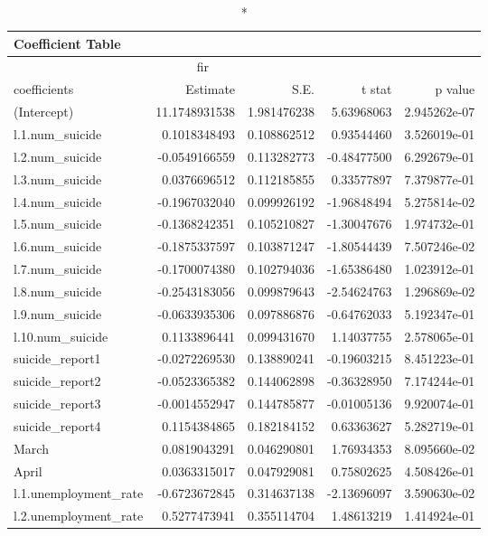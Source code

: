 \begin{longtable}{lrrrr}
\caption*{
{\large Coefficient Table}
} \\ 
\toprule
\multicolumn{4}{c}{fir} &  \\ 
\cmidrule(lr){1-4}
coefficients & Estimate & S.E. & t stat & p value \\ 
\midrule
(Intercept) & 11.1748931538 & 1.981476238 & 5.63968063 & 2.945262e-07 \\ 
l.1.num\_suicide & 0.1018348493 & 0.108862512 & 0.93544460 & 3.526019e-01 \\ 
l.2.num\_suicide & -0.0549166559 & 0.113282773 & -0.48477500 & 6.292679e-01 \\ 
l.3.num\_suicide & 0.0376696512 & 0.112185855 & 0.33577897 & 7.379877e-01 \\ 
l.4.num\_suicide & -0.1967032040 & 0.099926192 & -1.96848494 & 5.275814e-02 \\ 
l.5.num\_suicide & -0.1368242351 & 0.105210827 & -1.30047676 & 1.974732e-01 \\ 
l.6.num\_suicide & -0.1875337597 & 0.103871247 & -1.80544439 & 7.507246e-02 \\ 
l.7.num\_suicide & -0.1700074380 & 0.102794036 & -1.65386480 & 1.023912e-01 \\ 
l.8.num\_suicide & -0.2543183056 & 0.099879643 & -2.54624763 & 1.296869e-02 \\ 
l.9.num\_suicide & -0.0633935306 & 0.097886876 & -0.64762033 & 5.192347e-01 \\ 
l.10.num\_suicide & 0.1133896441 & 0.099431670 & 1.14037755 & 2.578065e-01 \\ 
suicide\_report1 & -0.0272269530 & 0.138890241 & -0.19603215 & 8.451223e-01 \\ 
suicide\_report2 & -0.0523365382 & 0.144062898 & -0.36328950 & 7.174244e-01 \\ 
suicide\_report3 & -0.0014552947 & 0.144785877 & -0.01005136 & 9.920074e-01 \\ 
suicide\_report4 & 0.1154384865 & 0.182184152 & 0.63363627 & 5.282719e-01 \\ 
March & 0.0819043291 & 0.046290801 & 1.76934353 & 8.095660e-02 \\ 
April & 0.0363315017 & 0.047929081 & 0.75802625 & 4.508426e-01 \\ 
l.1.unemployment\_rate & -0.6723672845 & 0.314637138 & -2.13696097 & 3.590630e-02 \\ 
l.2.unemployment\_rate & 0.5277473941 & 0.355114704 & 1.48613219 & 1.414924e-01 \\ 

\end{longtable}
